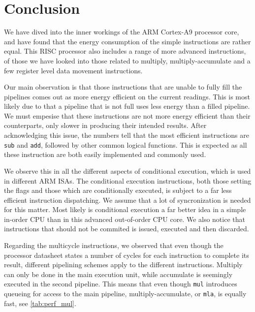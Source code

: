 \section{Conclusion}
We have dived into the inner workings of the ARM Cortex-A9 processor core, and
have found that the energy consumption of the simple instructions are rather
equal. This RISC processor also includes a range of more advanced instructions,
of those we have looked into those related to multiply, multiply-accumulate and
a few register level data movement instructions.

Our main observation is that those instructions that are unable to fully fill
the pipelines comes out as more energy efficient on the current readings. This
is most likely due to that a pipeline that is not full uses less energy than a
filled pipeline. We must empesise that these instructions are not more energy
efficient than their counterparts, only slower in producing their intended
results.  After acknowledging this issue, the numbers tell that the most
efficient instructions are \texttt{sub} and \texttt{add}, followed by other
common logical functions. This is expected as all these instruction are both
easily implemented and commonly used.

We observe this in all the different aspects of conditional
execution, which is used in different ARM ISAs. The conditional execution
instructions, both those setting the flags and those which are conditionally
executed, is subject to a far less efficient instruction dispatching. We assume
that a lot of syncronization is needed for this matter. Most likely is
conditional execution a far better idea in a simple in-order CPU than in this
advanced out-of-order CPU core. We also notice that instructions that should not
be commited is issued, executed and then discarded.

Regarding the multicycle instructions, we observed that even though the processor
datasheet\cite{armtech} states a number of cycles for each instruction to complete
its result, different pipelining schemes apply to the different instructions. Multiply
can only be done in the main execution unit, while accumulate is seemingly executed in
the second pipeline. This means that even though \texttt{mul} introduces queueing for access
to the main pipeline, multiply-accumulate, or \texttt{mla}, is equally fast, see \autoref{tab:perf_mul}.

